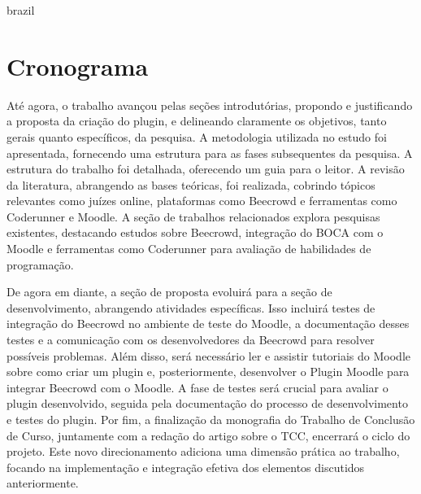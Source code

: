 

\begin{otherlanguage*}{brazil}

    \chapter{Cronograma}
    
    Até agora, o trabalho avançou pelas seções introdutórias, propondo e justificando a proposta da criação do plugin, e delineando claramente os objetivos, tanto gerais quanto específicos, da pesquisa. A metodologia utilizada no estudo foi apresentada, fornecendo uma estrutura para as fases subsequentes da pesquisa. A estrutura do trabalho foi detalhada, oferecendo um guia para o leitor. A revisão da literatura, abrangendo as bases teóricas, foi realizada, cobrindo tópicos relevantes como juízes online, plataformas como Beecrowd e ferramentas como Coderunner e Moodle. A seção de trabalhos relacionados explora pesquisas existentes, destacando estudos sobre Beecrowd, integração do BOCA com o Moodle e ferramentas como Coderunner para avaliação de habilidades de programação.

    De agora em diante, a seção de proposta evoluirá para a seção de desenvolvimento, abrangendo atividades específicas. Isso incluirá testes de integração do Beecrowd no ambiente de teste do Moodle, a documentação desses testes e a comunicação com os desenvolvedores da Beecrowd para resolver possíveis problemas. Além disso, será necessário ler e assistir tutoriais do Moodle sobre como criar um plugin e, posteriormente, desenvolver o Plugin Moodle para integrar Beecrowd com o Moodle. A fase de testes será crucial para avaliar o plugin desenvolvido, seguida pela documentação do processo de desenvolvimento e testes do plugin. Por fim, a finalização da monografia do Trabalho de Conclusão de Curso, juntamente com a redação do artigo sobre o TCC, encerrará o ciclo do projeto. Este novo direcionamento adiciona uma dimensão prática ao trabalho, focando na implementação e integração efetiva dos elementos discutidos anteriormente.


\end{otherlanguage*}
